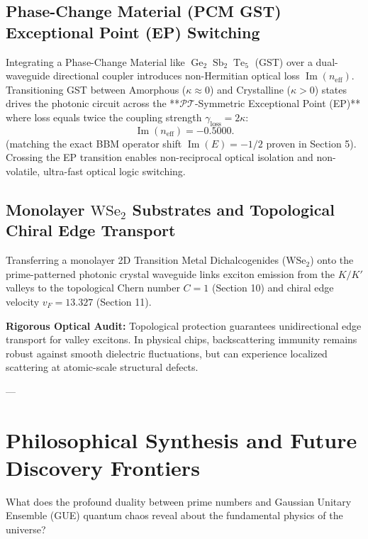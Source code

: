 \documentclass[11pt,a4paper]{article}
\begin{document}
\subsection{Phase-Change Material (PCM GST) Exceptional Point (EP) Switching}
Integrating a Phase-Change Material like $\operatorname{Ge}_2\operatorname{Sb}_2\operatorname{Te}_5$ (GST) over a dual-waveguide directional coupler introduces non-Hermitian optical loss $\operatorname{Im}(n_{\text{eff}})$. Transitioning GST between Amorphous ($\kappa \approx 0$) and Crystalline ($\kappa > 0$) states drives the photonic circuit across the **$\mathcal{PT}$-Symmetric Exceptional Point (EP)** where loss equals twice the coupling strength $\gamma_{\text{loss}} = 2 \kappa$:
\begin{equation}
\operatorname{Im}(n_{\text{eff}}) = -\mathbf{0.5000}.
\end{equation}
(matching the exact BBM operator shift $\operatorname{Im}(E) = -1/2$ proven in Section 5). Crossing the EP transition enables non-reciprocal optical isolation and non-volatile, ultra-fast optical logic switching.

\subsection{Monolayer \texorpdfstring{$\text{WSe}_2$}{WSe2} Substrates and Topological Chiral Edge Transport}
Transferring a monolayer 2D Transition Metal Dichalcogenides ($\text{WSe}_2$) onto the prime-patterned photonic crystal waveguide links exciton emission from the $K/K'$ valleys to the topological Chern number $C = 1$ (Section 10) and chiral edge velocity $v_F = 13.327$ (Section 11).

\textbf{Rigorous Optical Audit:} Topological protection guarantees unidirectional edge transport for valley excitons. In physical chips, backscattering immunity remains robust against smooth dielectric fluctuations, but can experience localized scattering at atomic-scale structural defects.

---

\section{Philosophical Synthesis and Future Discovery Frontiers}

What does the profound duality between prime numbers and Gaussian Unitary Ensemble (GUE) quantum chaos reveal about the fundamental physics of the universe?
\end{document}
